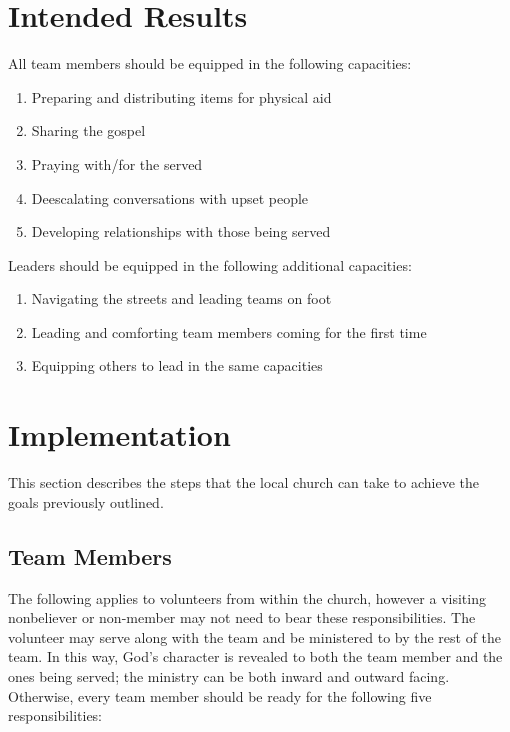 \documentclass[12pt]{article}
\begin{document}
\qJamesOneTwentySeven

\section{Intended Results}

    All team members should be equipped in the following capacities:
    \begin{enumerate}
        \item Preparing and distributing items for physical aid
        \item Sharing the gospel
        \item Praying with/for the served
        \item Deescalating conversations with upset people
        \item Developing relationships with those being served
    \end{enumerate}

    Leaders should be equipped in the following additional capacities:
    \begin{enumerate}
        \item Navigating the streets and leading teams on foot
        \item Leading and comforting team members coming for the first time
        \item Equipping others to lead in the same capacities
    \end{enumerate}

\section{Implementation}

This section describes the steps that the local church can take to achieve the goals previously outlined.

\subsection{Team Members}

    The following applies to volunteers from within the church, however a visiting nonbeliever or non-member may not need to bear these responsibilities.
    The volunteer may serve along with the team and be ministered to by the rest of the team.
    In this way, God's character is revealed to both the team member and the ones being served; the ministry can be both inward and outward facing.
    Otherwise, every team member should be ready for the following five responsibilities:
\end{document}
